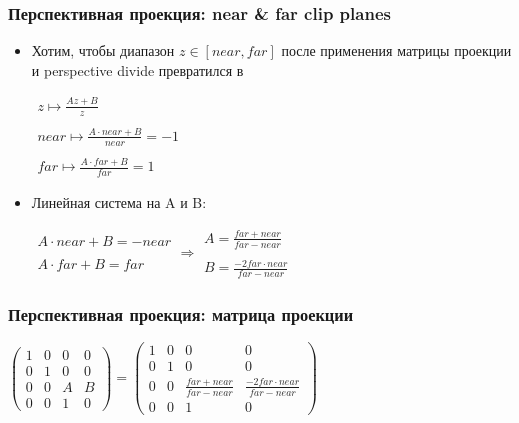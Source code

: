 \documentclass{beamer}
\begin{document}
\begin{frame}[fragile]
\frametitle{Перспективная проекция: near \& far clip planes}
\begin{itemize}
\item Хотим, чтобы диапазон \begin{math}z\in [near,far]\end{math} после применения матрицы проекции и perspective divide превратился в \begin{math}[-1,1]\end{math}
\pause
\begin{center}
\begin{math}
\begin{matrix}
z \mapsto \frac{Az + B}{z} \\ \\
near \mapsto \frac{A\cdot near + B}{near} = -1 \\ \\
far \mapsto \frac{A\cdot far + B}{far} = 1
\end{matrix}
\end{math}
\end{center}
\pause
\item Линейная система на A и B:
\begin{center}
\begin{math}
\begin{matrix}
A \cdot near + B = -near \\ \\
A \cdot far + B = far
\end{matrix}
\Rightarrow
\begin{matrix}
A = \frac{far + near}{far - near} \\ \\
B = \frac{-2 far \cdot near}{far - near}
\end{matrix}
\end{math}
\end{center}
\end{itemize}
\end{frame}

\begin{frame}[fragile]
\frametitle{Перспективная проекция: матрица проекции}
\begin{center}
\begin{math}
\begin{pmatrix}
1 & 0 & 0 & 0 \\
0 & 1 & 0 & 0 \\
0 & 0 & A & B \\
0 & 0 & 1 & 0
\end{pmatrix}
=
\begin{pmatrix}
1 & 0 & 0 & 0 \\
0 & 1 & 0 & 0 \\
0 & 0 & \frac{far + near}{far - near} & \frac{-2 far \cdot near}{far - near} \\
0 & 0 & 1 & 0
\end{pmatrix}
\end{math}
\end{center}
\end{frame}
\end{document}
